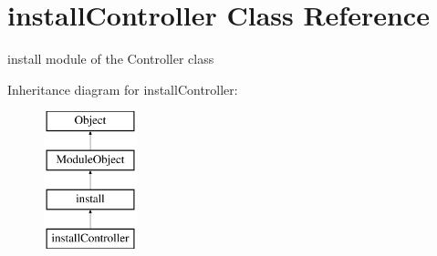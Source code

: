 \hypertarget{classinstallController}{\section{install\-Controller Class Reference}
\label{classinstallController}
}


install module of the Controller class  


Inheritance diagram for install\-Controller\-:\begin{figure}[H]
\begin{center}
\leavevmode
\includegraphics[height=4.000000cm]{classinstallController}
\end{center}
\end{figure}
